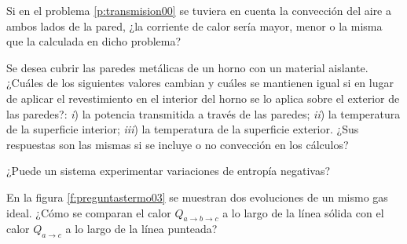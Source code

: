 %
\begin{Exercise}
  Si en el problema \ref{p:transmision00} se tuviera en cuenta la convección del aire a ambos lados de la pared, ¿la corriente de calor sería mayor, menor o la misma que la calculada en dicho problema?
\end{Exercise}
%
\begin{Exercise}
  Se desea cubrir las paredes metálicas de un horno con un material aislante. ¿Cuáles de los siguientes valores cambian y cuáles se mantienen igual si en lugar de aplicar el revestimiento en el interior del horno se lo aplica sobre el exterior de las paredes?: \textit{i}) la potencia transmitida a través de las paredes; \textit{ii}) la temperatura de la superficie interior; \textit{iii}) la temperatura de la superficie exterior. ¿Sus respuestas son las mismas si se incluye o no convección en los cálculos?
\end{Exercise}
%
\begin{Exercise}
  ¿Puede un sistema experimentar variaciones de entropía negativas?
\end{Exercise}
%
\begin{Exercise}\label{p:preguntastermo03}
  En la figura \ref{f:preguntastermo03} se muestran dos evoluciones de un mismo gas ideal. ¿Cómo se comparan el calor $Q_{a\rightarrow b \rightarrow c}$ a lo largo de la línea sólida con el calor $Q_{a\rightarrow c}$ a lo largo de la línea punteada?
\end{Exercise}
%
\begin{center}
\end{center}
